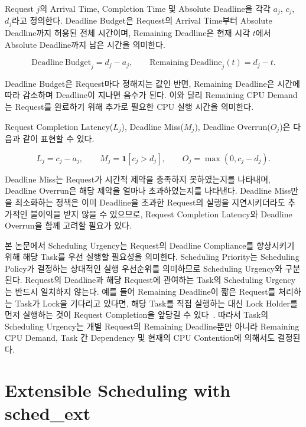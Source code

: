 Request $j$의 Arrival Time, Completion Time 및
Absolute Deadline을 각각 $a_j$, $c_j$, $d_j$라고 정의한다.
Deadline Budget은 Request의 Arrival Time부터 Absolute Deadline까지
허용된 전체 시간이며, Remaining Deadline은 현재 시각 $t$에서
Absolute Deadline까지 남은 시간을 의미한다.

\begin{equation}
    \mathrm{Deadline\ Budget}_j = d_j-a_j,\qquad
    \mathrm{Remaining\ Deadline}_j(t) = d_j-t.
    \label{eq:deadline_times}
\end{equation}

Deadline Budget은 Request마다 정해지는 값인 반면,
Remaining Deadline은 시간에 따라 감소하며 Deadline이 지나면 음수가 된다.
이와 달리 Remaining CPU Demand는 Request를 완료하기 위해
추가로 필요한 CPU 실행 시간을 의미한다.

Request Completion Latency($L_j$), Deadline Miss($M_j$),
Deadline Overrun($O_j$)은 다음과 같이 표현할 수 있다.

\begin{equation}
    L_j = c_j - a_j,\qquad M_j = \mathbf{1}[c_j > d_j],\qquad O_j = \max(0, c_j - d_j).
\end{equation}

Deadline Miss는 Request가 시간적 제약을 충족하지 못하였는지를
나타내며, Deadline Overrun은 해당 제약을 얼마나 초과하였는지를
나타낸다.
Deadline Miss만을 최소화하는 정책은 이미 Deadline을 초과한
Request의 실행을 지연시키더라도 추가적인 불이익을 받지 않을 수
있으므로, Request Completion Latency와 Deadline Overrun을
함께 고려할 필요가 있다.

본 논문에서 Scheduling Urgency는 Request의 Deadline Compliance를
향상시키기 위해 해당 Task를 우선 실행할 필요성을 의미한다.
Scheduling Priority는 Scheduling Policy가 결정하는 상대적인 실행
우선순위를 의미하므로 Scheduling Urgency와 구분된다.
Request의 Deadline과 해당 Request에 관여하는 Task의
Scheduling Urgency는 반드시 일치하지 않는다.
예를 들어 Remaining Deadline이 짧은 Request를 처리하는 Task가
Lock을 기다리고 있다면, 해당 Task를 직접 실행하는 대신
Lock Holder를 먼저 실행하는 것이 Request Completion을
앞당길 수 있다~\cite{sha1990}.
따라서 Task의 Scheduling Urgency는 개별 Request의
Remaining Deadline뿐만 아니라 Remaining CPU Demand, Task 간 Dependency 및
현재의 CPU Contention에 의해서도 결정된다.


\section{Extensible Scheduling with sched\_ext}
\label{sec:background-extensible-scheduling-with-sched-ext}


